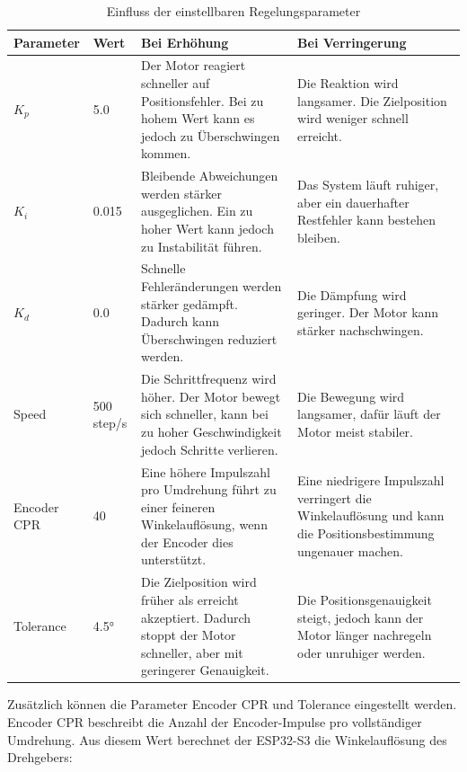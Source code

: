 \documentclass[a4paper,12pt]{article}
\begin{document}
\begin{table}[H]
\centering
\caption{Einfluss der einstellbaren Regelungsparameter}
\renewcommand{\arraystretch}{1.25}
\begin{tabular}{p{2.6cm}p{2.2cm}p{4.6cm}p{4.6cm}}
\toprule
Parameter & Wert & Bei Erhöhung & Bei Verringerung \\
\midrule

\(K_p\)
& 5.0
& Der Motor reagiert schneller auf Positionsfehler. Bei zu hohem Wert kann es jedoch zu Überschwingen kommen.
& Die Reaktion wird langsamer. Die Zielposition wird weniger schnell erreicht. \\

\(K_i\)
& 0.015
& Bleibende Abweichungen werden stärker ausgeglichen. Ein zu hoher Wert kann jedoch zu Instabilität führen.
& Das System läuft ruhiger, aber ein dauerhafter Restfehler kann bestehen bleiben. \\

\(K_d\)
& 0.0
& Schnelle Fehleränderungen werden stärker gedämpft. Dadurch kann Überschwingen reduziert werden.
& Die Dämpfung wird geringer. Der Motor kann stärker nachschwingen. \\

Speed
& 500\,step/s
& Die Schrittfrequenz wird höher. Der Motor bewegt sich schneller, kann bei zu hoher Geschwindigkeit jedoch Schritte verlieren.
& Die Bewegung wird langsamer, dafür läuft der Motor meist stabiler. \\

Encoder CPR
& 40
& Eine höhere Impulszahl pro Umdrehung führt zu einer feineren Winkelauflösung, wenn der Encoder dies unterstützt.
& Eine niedrigere Impulszahl verringert die Winkelauflösung und kann die Positionsbestimmung ungenauer machen. \\

Tolerance
& 4.5°
& Die Zielposition wird früher als erreicht akzeptiert. Dadurch stoppt der Motor schneller, aber mit geringerer Genauigkeit.
& Die Positionsgenauigkeit steigt, jedoch kann der Motor länger nachregeln oder unruhiger werden. \\

\bottomrule
\end{tabular}
\end{table}



Zusätzlich können die Parameter Encoder CPR und Tolerance eingestellt werden. 
Encoder CPR beschreibt die Anzahl der Encoder-Impulse pro vollständiger Umdrehung. 
Aus diesem Wert berechnet der ESP32-S3 die Winkelauflösung des Drehgebers:
\end{document}
